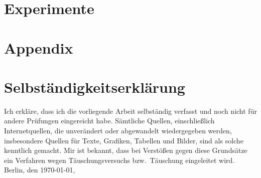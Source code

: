 \documentclass[draft=false,twoside,12pt]{scrreprt}
\begin{document}
\chapter{Experimente}



\appendix
\chapter{Appendix}



\printbibliography

\chapter*{Selbständigkeitserklärung}
Ich erkläre, dass ich die vorliegende Arbeit selbständig verfasst und noch nicht 
für andere Prüfungen eingereicht habe. Sämtliche Quellen, einschließlich
Internetquellen, die unverändert oder abgewandelt wiedergegeben werden,
insbesondere Quellen für Texte, Grafiken, Tabellen und Bilder, sind als solche
kenntlich gemacht. Mir ist bekannt, dass bei Verstößen gegen diese Grundsätze ein
Verfahren wegen Täuschungsversuchs bzw.\ Täuschung eingeleitet wird. 
\bigbreak
\noindent Berlin, den \today, 
\end{document}
